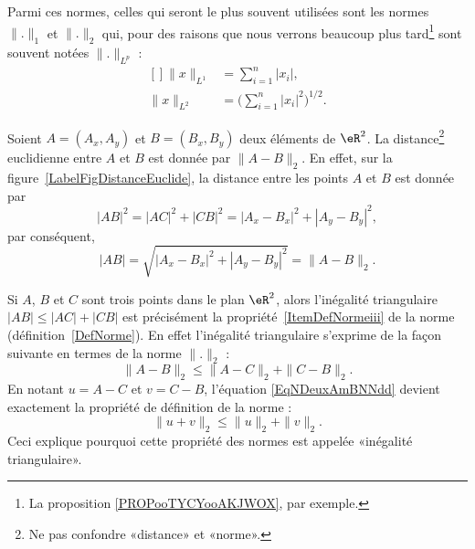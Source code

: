 Parmi ces normes, celles qui seront le plus souvent utilisées sont les normes \( \| . \|_1\) et \( \| . \|_2\) qui, pour des raisons que nous verrons beaucoup plus tard\footnote{La proposition \ref{PROPooTYCYooAKJWOX}, par exemple.} sont souvent notées \( \|.  \|_{L^p}\) :
\begin{equation}
    \begin{aligned}[]
        \| x \|_{L^1} & =\sum_{i=1}^n| x_i |,                         \\
        \| x \|_{L^2} & =\Big( \sum_{i=1}^n| x_i |^2 \Big)^{1/2}.
    \end{aligned}
\end{equation}

\newcommand{\CaptionFigDistanceEuclide}{La \emph{norme} euclidienne induit la \emph{distance} euclidienne. D'où son nom. Le point $C$ est construit aux coordonnées $(A_x,B_y)$.}


Soient $A=(A_x,A_y)$ et $B=(B_x,B_y)$ deux éléments de $\eR^2$. La distance\footnote{Ne pas confondre «distance» et «norme».} euclidienne entre $A$ et $B$ est donnée par $\| A-B \|_2$. En effet, sur la figure~\ref{LabelFigDistanceEuclide}, la distance entre les points $A$ et $B$ est donnée par
\begin{equation}
    | AB |^2=| AC |^2+| CB |^2=| A_x-B_x |^2+| A_y-B_y |^2,
\end{equation}
par conséquent,
\begin{equation}
    | AB |=\sqrt{| A_x-B_x |^2+| A_y-B_y |^2}=\| A-B \|_2.
\end{equation}

\begin{remark}
    Si $A$, $B$ et $C$ sont trois points dans le plan $\eR^2$, alors l'inégalité triangulaire $| AB |\leq| AC |+| CB |$ est précisément la propriété~\ref{ItemDefNormeiii} de la norme (définition~\ref{DefNorme}). En effet l'inégalité triangulaire s'exprime de la façon suivante en termes de la norme $\| . \|_2$ :
    \begin{equation}    \label{EqNDeuxAmBNNdd}
        \| A-B \|_2\leq \| A-C \|_2+\| C-B \|_2.
    \end{equation}
    En notant $u=A-C$ et $v=C-B$, l'équation \eqref{EqNDeuxAmBNNdd} devient exactement la propriété de définition de la norme :
    \begin{equation}
        \| u+v \|_2\leq \| u \|_2+\| v \|_2.
    \end{equation}
    Ceci explique pourquoi cette propriété des normes est appelée «inégalité triangulaire».
\end{remark}

